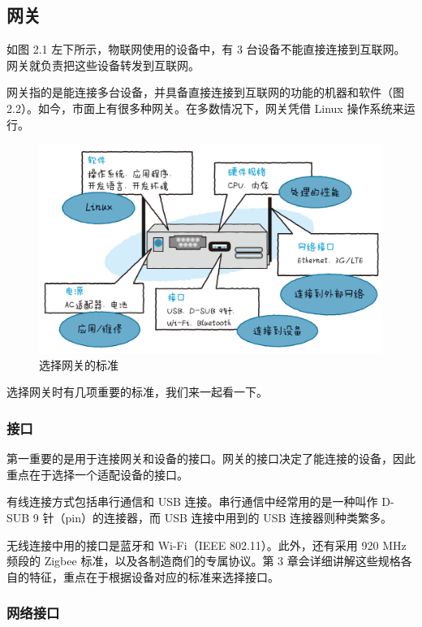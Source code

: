 \documentclass[12pt,UTF8]{ctexbook}
\begin{document}
\subsection{网关}

如图 2.1 左下所示，物联网使用的设备中，有 3 台设备不能直接连接到互联网。网关就负责把这些设备转发到互联网。

网关指的是能连接多台设备，并具备直接连接到互联网的功能的机器和软件（图 2.2）。如今，市面上有很多种网关。在多数情况下，网关凭借 Linux 操作系统来运行。

\begin{figure}[htbp]
	\centering
	\includegraphics[width=1\linewidth]{21}
	\caption{选择网关的标准}
	\label{fig:1}
\end{figure}

选择网关时有几项重要的标准，我们来一起看一下。

\subsubsection{接口}

第一重要的是用于连接网关和设备的接口。网关的接口决定了能连接的设备，因此重点在于选择一个适配设备的接口。

有线连接方式包括串行通信和 USB 连接。串行通信中经常用的是一种叫作 D-SUB 9 针（pin）的连接器，而 USB 连接中用到的 USB 连接器则种类繁多。

无线连接中用的接口是蓝牙和 Wi-Fi（IEEE 802.11）。此外，还有采用 920 MHz 频段的 Zigbee 标准，以及各制造商们的专属协议。第 3 章会详细讲解这些规格各自的特征，重点在于根据设备对应的标准来选择接口。

\subsubsection{网络接口}
\end{document}
